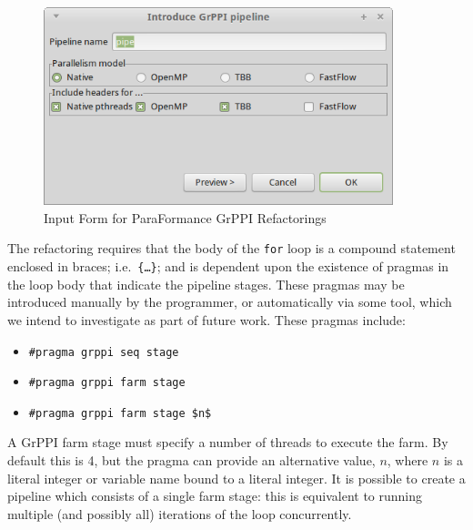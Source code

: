 \begin{figure}
\centering
\includegraphics[width=4in]{figures/InputForm.png}
\caption{Input Form for ParaFormance GrPPI Refactorings}
\label{fig:inputform}
\end{figure}

\noindent
The refactoring requires that the body of the \texttt{for} loop is a compound statement enclosed in braces; i.e.\ \texttt{\{\dots\}}; and is dependent upon the existence of pragmas in the loop body that indicate the pipeline stages. These pragmas may be introduced manually by the programmer, or automatically via some tool, which we intend to investigate as part of future work.
These pragmas include:
% 
\begin{itemize}
\item
  \lstinline|#pragma grppi seq stage|
\item
  \lstinline|#pragma grppi farm stage|
\item
  \lstinline[mathescape]|#pragma grppi farm stage $n$|
\end{itemize}

\noindent
A GrPPI farm stage must specify a number of threads to execute the farm.
By default this is 4, but the pragma can provide an alternative value, $n$, where $n$ is a literal integer or variable name bound to a literal integer.
%
It is possible to create a pipeline which consists of a single
farm stage: this is equivalent to running multiple (and possibly all)
iterations of the loop concurrently.

